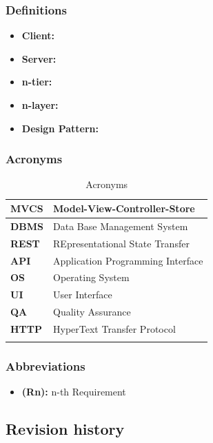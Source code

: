 \documentclass[titlepage]{article}
\begin{document}
	\subsubsection{Definitions}
	
	\begin{itemize}
				\item {\bf Client: } 
				\item {\bf Server: } 
				\item {\bf n-tier: } 
				\item {\bf n-layer: } 
				\item {\bf Design Pattern: } 
	\end{itemize}
	
	
	\subsubsection{Acronyms}
	
	\begin{longtable}{| p{2 cm} | p{7 cm} |} \hline
		{\bf MVCS} & Model-View-Controller-Store \\\hline
		{\bf DBMS} & Data Base Management System \\ \hline
		{\bf REST} & REpresentational State Transfer \\ \hline
		{\bf API} & Application Programming Interface \\ \hline
		{\bf OS} & Operating System\\ \hline
		{\bf UI} & User Interface \\ \hline
		{\bf QA} & Quality Assurance \\ \hline		
		{\bf HTTP} & HyperText Transfer Protocol \\ \hline			
		\caption{Acronyms}	
						
	\end{longtable}

	\subsubsection{Abbreviations}
	
	\begin{itemize}
		\item {\bf (Rn):} n-th Requirement
	\end{itemize}
			
			
\subsection{Revision history}
\end{document}
